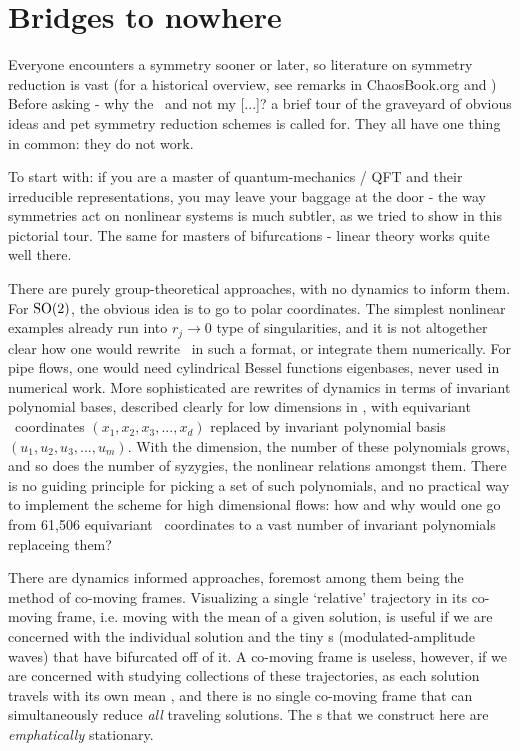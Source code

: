 \documentclass[aip,cha,reprint,
secnumarabic,
nofootinbib, tightenlines,
nobibnotes, showkeys, showpacs,
groupedaddress
]{revtex4-1}
\begin{document}
\section{Bridges to nowhere}
\label{s:bridge}

Everyone encounters a symmetry sooner or later, so literature on symmetry
reduction is vast (for a historical overview, see remarks in
ChaosBook.org and ) Before asking - why the \mslices\ and
not my [...]? a brief tour of the graveyard of obvious ideas and pet
symmetry reduction schemes is called for. They all have one thing in
common: they do not work.

To start with: if you are a master of quantum-mechanics / QFT and their
irreducible representations, you may leave your baggage at the
door - the way symmetries act on nonlinear systems is much subtler, as we
tried to show in this pictorial tour. The same for masters of
bifurcations - linear theory works quite well there.

There are purely group-theoretical approaches, with no dynamics to inform
them. For $\textrm{SO}(2)$, the obvious idea is to go to polar coordinates. The
simplest nonlinear examples already run into $r_j \to 0$ type
of singularities, and it is not altogether clear how one would rewrite
\NSe\ in such a format, or integrate them numerically. For pipe flows, one
would need cylindrical Bessel functions eigenbases, never used in
numerical work. More sophisticated are rewrites of dynamics in terms of
invariant polynomial bases, described clearly for low dimensions in
, with equivariant \statesp\ coordinates
$(x_1,x_2,x_3,...,x_d)$ replaced by invariant polynomial basis
$(u_1,u_2,u_3,...,u_m)$. With the dimension, the number of these
polynomials grows, and so does the number of syzygies, the nonlinear
relations amongst them. There is no guiding principle for picking a set of
such polynomials, and no practical way to implement the
scheme for high dimensional flows: how and why would one
go from 61,506 equivariant \statesp\ coordinates to a vast number of
invariant polynomials replaceing them?

There are dynamics informed approaches, foremost among them being the method of
{co-moving frames}. Visualizing a single `relative' trajectory in its
co-moving frame, i.e. moving with the mean {\phaseVel} of a given solution, is
useful if we are concerned with the individual solution and the tiny
\rpo s (modulated-amplitude waves) that have bifurcated off of it. A co-moving frame is useless, however, if we are
concerned with studying collections of these trajectories, as each
solution travels with its own mean {\phaseVel}, and there is no single
co-moving frame that can simultaneously reduce \emph{all} traveling
solutions. The \slice s that we construct here are \emph{emphatically}
stationary.
\end{document}
